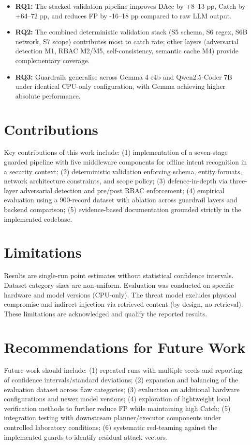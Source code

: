 \begin{itemize}
  \item \textbf{RQ1:} The stacked validation pipeline improves DAcc by +8--13 pp, Catch by +64--72 pp, and reduces FP by -16--18 pp compared to raw LLM output.
  \item \textbf{RQ2:} The combined deterministic validation stack (S5 schema, S6 regex, S6B network, S7 scope) contributes most to catch rate; other layers (adversarial detection M1, RBAC M2/M5, self-consistency, semantic cache M4) provide complementary coverage.
  \item \textbf{RQ3:} Guardrails generalise across Gemma 4 e4b and Qwen2.5-Coder 7B under identical CPU-only configuration, with Gemma achieving higher absolute performance.
\end{itemize}

\section{Contributions}\label{sec:concl-contrib}

Key contributions of this work include: (1) implementation of a seven-stage guarded pipeline with five middleware components for offline intent recognition in a security context; (2) deterministic validation enforcing schema, entity formats, network architecture constraints, and scope policy; (3) defence-in-depth via three-layer adversarial detection and pre/post RBAC enforcement; (4) empirical evaluation using a 900-record dataset with ablation across guardrail layers and backend comparison; (5) evidence-based documentation grounded strictly in the implemented codebase.

\section{Limitations}\label{sec:concl-limitations}

Results are single-run point estimates without statistical confidence intervals. Dataset category sizes are non-uniform. Evaluation was conducted on specific hardware and model versions (CPU-only). The threat model excludes physical compromise and indirect injection via retrieved content (by design, no retrieval). These limitations are acknowledged and qualify the reported results.

\section{Recommendations for Future Work}\label{sec:concl-recommendations}

Future work should include: (1) repeated runs with multiple seeds and reporting of confidence intervals/standard deviations; (2) expansion and balancing of the evaluation dataset across flaw categories; (3) evaluation on additional hardware configurations and newer model versions; (4) exploration of lightweight local verification methods to further reduce FP while maintaining high Catch; (5) integration testing with downstream planner/executor components under controlled laboratory conditions; (6) systematic red-teaming against the implemented guards to identify residual attack vectors.
